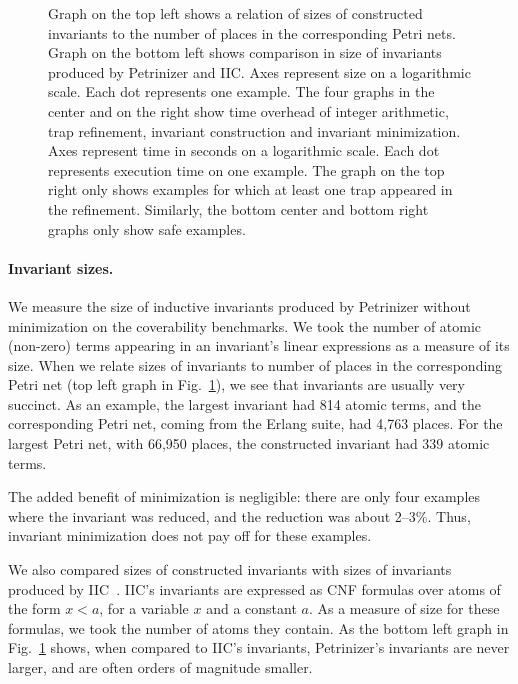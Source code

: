 \begin{figure}[t]
  \centering
  
  \caption[Invariant sizes and time overhead of Petrinizer options.]{Graph on the top left shows a relation of sizes of constructed
  invariants to the number of places in the corresponding Petri nets. Graph
  on the bottom left shows comparison in size of invariants produced by Petrinizer and
  IIC\@. Axes represent size on a logarithmic scale. Each dot represents
  one example.
  The four graphs in the center and on the right show time
  overhead of integer arithmetic, trap refinement, invariant
  construction and invariant minimization. Axes represent time in
  seconds on a logarithmic scale. Each dot represents execution time
  on one example. The graph on the top right only shows examples for
  which at least one trap appeared in the refinement. Similarly, the
  bottom center and bottom right graphs only show safe examples.}
\label{fig:petrinizer-various}
\end{figure}

\paragraph{Invariant sizes.} 
We measure the size of inductive invariants produced by Pe\-tri\-ni\-zer without
minimization on the coverability benchmarks.
We took the number of atomic (non-zero) terms appearing in an invariant's linear expressions
as a measure of its size. When we relate sizes of invariants to number of places
in the corresponding Petri net (top left graph in Fig.~\ref{fig:petrinizer-various}), we
see that invariants are usually very succinct. As an example, the
largest invariant had 814 atomic terms, and the corresponding Petri net, coming
from the Erlang suite, had 4,763 places. For the largest Petri net, 
with 66,950 places, the constructed invariant had 339 atomic
terms.

The added benefit of minimization is negligible: there are only four examples where the invariant
was reduced, and the reduction was about 2–3\%. 
Thus, invariant minimization does not pay off for these examples.

We also compared sizes of constructed invariants with
sizes of invariants produced by IIC~\cite{KloosMNP13}. IIC's invariants
are expressed as CNF formulas over atoms of the form $x<a$,
for a variable $x$ and a constant $a$. As a measure of size for these formulas,
we took the number of atoms they contain. As the bottom left graph in
Fig.~\ref{fig:petrinizer-various} shows, when compared to IIC's invariants, Petrinizer's invariants
are never larger, and are often orders of magnitude smaller.

